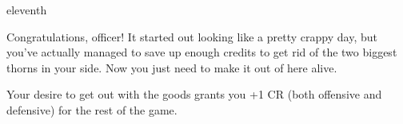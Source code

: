 \documentclass[greennotebook]{guildcamp4} %
\begin{document}
\begin{page}{eleventh}

Congratulations, officer! It started out looking like a pretty crappy day, but you've actually managed to save up enough credits to get rid of the two biggest thorns in your side. Now you just need to make it out of here alive.

Your desire to get out with the goods grants you +1 CR (both offensive and defensive) for the rest of the game.

\end{page}

\endnotebook
\end{document}

